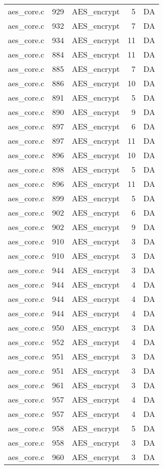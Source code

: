 \begin{table}
\begin{tabular}{clrrr}
aes\_core.c& 929&AES\_encrypt&5 &DA\\
aes\_core.c& 932&AES\_encrypt&7 &DA\\
aes\_core.c& 934&AES\_encrypt&11&DA\\
aes\_core.c& 884&AES\_encrypt&11&DA\\
aes\_core.c& 885&AES\_encrypt&7 &DA\\
aes\_core.c& 886&AES\_encrypt&10&DA\\
aes\_core.c& 891&AES\_encrypt&5 &DA\\
aes\_core.c& 890&AES\_encrypt&9 &DA\\
aes\_core.c& 897&AES\_encrypt&6 &DA\\
aes\_core.c& 897&AES\_encrypt&11&DA\\
aes\_core.c& 896&AES\_encrypt&10&DA\\
aes\_core.c& 898&AES\_encrypt&5 &DA\\
aes\_core.c& 896&AES\_encrypt&11&DA\\
aes\_core.c& 899&AES\_encrypt&5 &DA\\
aes\_core.c& 902&AES\_encrypt&6 &DA\\
aes\_core.c& 902&AES\_encrypt&9 &DA\\
aes\_core.c& 910&AES\_encrypt&3 &DA\\
aes\_core.c& 910&AES\_encrypt&3 &DA\\
aes\_core.c& 944&AES\_encrypt&3 &DA\\
aes\_core.c& 944&AES\_encrypt&4 &DA\\
aes\_core.c& 944&AES\_encrypt&4 &DA\\
aes\_core.c& 944&AES\_encrypt&4 &DA\\
aes\_core.c& 950&AES\_encrypt&3 &DA\\
aes\_core.c& 952&AES\_encrypt&4 &DA\\
aes\_core.c& 951&AES\_encrypt&3 &DA\\
aes\_core.c& 951&AES\_encrypt&3 &DA\\
aes\_core.c& 961&AES\_encrypt&3 &DA\\
aes\_core.c& 957&AES\_encrypt&4 &DA\\
aes\_core.c& 957&AES\_encrypt&4 &DA\\
aes\_core.c& 958&AES\_encrypt&5 &DA\\
aes\_core.c& 958&AES\_encrypt&3 &DA\\
aes\_core.c& 960&AES\_encrypt&3 &DA\\
\hline
\end{tabular}
\end{table}